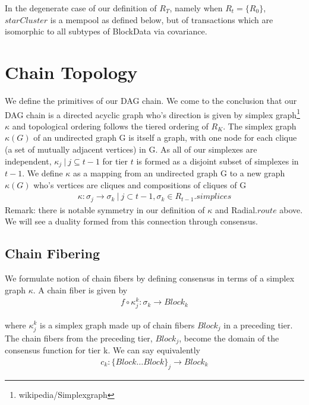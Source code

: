 \documentclass{article}
\begin{document}
In the degenerate case of our definition of $R_T$, namely when $R_t = \{R_0\}$, $starCluster$ is a mempool as defined below, but of transactions which are isomorphic to all subtypes of BlockData via covariance.

\section{Chain Topology}
We define the primitives of our DAG chain. We come to the conclusion that our DAG chain is a directed acyclic graph who's direction is given by simplex graph\footnote{wikipedia/Simplexgraph} $\kappa$ and topological ordering follows the tiered ordering of $R_K$. The simplex graph $\kappa(G)$ of an undirected graph G is itself a graph, with one node for each clique (a set of mutually adjacent vertices) in G. As all of our simplexes are independent, $\kappa_j \ | \ j \subseteq t-1$ for tier $t$ is formed as a disjoint subset of simplexes in $t-1$. We define $\kappa$ as a mapping from an undirected graph G to a new graph $\kappa(G)$ who's vertices are cliques and compositions of cliques of G
\begin{equation} \label{eq1}
\begin{split}
\kappa: \sigma_j \rightarrow \sigma_k \ | \ j \subset t-1, \sigma_k \in R_{t-1}.simplices
\end{split}
\end{equation}
Remark: there is notable symmetry in our definition of $\kappa$ and Radial.$route$ above. We will see a duality formed from this connection through consensus.

\subsection{Chain Fibering}
We formulate notion of chain fibers by defining consensus in terms of a simplex graph $\kappa$. A chain fiber is given by 
\begin{equation} \label{eq1}
\begin{split}
f \circ \kappa_j^{k}: \sigma_k  \rightarrow Block_k
\end{split}
\end{equation}

where $\kappa_j^{k}$ is a simplex graph made up of chain fibers $Block_j$ in a preceding tier. The chain fibers from the preceding tier, $Block_j$, become the domain of the consensus function for tier k. We can say equivalently
\begin{equation} \label{eq1}
\begin{split}
c_k: \{Block \dots Block\}_j \rightarrow Block_k
\end{split}
\end{equation}
\end{document}
